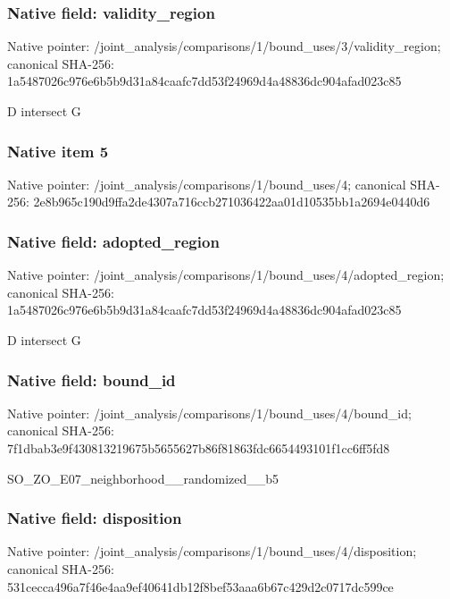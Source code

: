 \documentclass[10pt,a4paper]{article}
\begin{document}
\subsubsection{Native field: validity\_\allowbreak{}region}
Native pointer: /joint\_\allowbreak{}analysis/comparisons/1/bound\_\allowbreak{}uses/3/validity\_\allowbreak{}region; canonical SHA-256: 1a5487026c976e6b5b9d31a84caafc7dd53f24969d4a48836dc904afad023c85

\begingroup\raggedright\sloppy D intersect G\par\endgroup

\subsubsection{Native item 5}
Native pointer: /joint\_\allowbreak{}analysis/comparisons/1/bound\_\allowbreak{}uses/4; canonical SHA-256: 2e8b965c190d9ffa2de4307a716ccb271036422aa01d10535bb1a2694e0440d6

\subsubsection{Native field: adopted\_\allowbreak{}region}
Native pointer: /joint\_\allowbreak{}analysis/comparisons/1/bound\_\allowbreak{}uses/4/adopted\_\allowbreak{}region; canonical SHA-256: 1a5487026c976e6b5b9d31a84caafc7dd53f24969d4a48836dc904afad023c85

\begingroup\raggedright\sloppy D intersect G\par\endgroup

\subsubsection{Native field: bound\_\allowbreak{}id}
Native pointer: /joint\_\allowbreak{}analysis/comparisons/1/bound\_\allowbreak{}uses/4/bound\_\allowbreak{}id; canonical SHA-256: 7f1dbab3e9f430813219675b5655627b86f81863fdc6654493101f1cc6ff5fd8

\begingroup\raggedright\sloppy SO\_\allowbreak{}ZO\_\allowbreak{}E07\_\allowbreak{}neighborhood\_\allowbreak{}\_\allowbreak{}randomized\_\allowbreak{}\_\allowbreak{}b5\par\endgroup

\subsubsection{Native field: disposition}
Native pointer: /joint\_\allowbreak{}analysis/comparisons/1/bound\_\allowbreak{}uses/4/disposition; canonical SHA-256: 531cecca496a7f46e4aa9ef40641db12f8bef53aaa6b67c429d2c0717dc599ce
\end{document}
